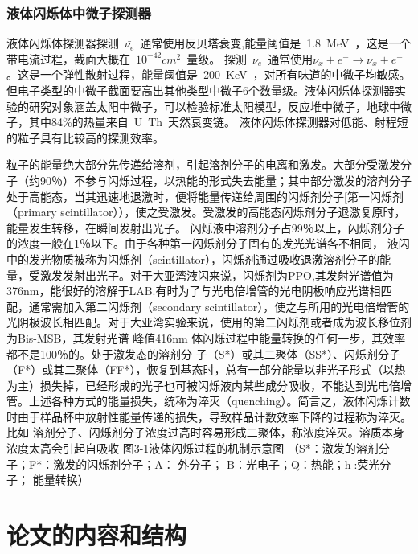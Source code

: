 \subsubsection{液体闪烁体中微子探测器}
液体闪烁体探测器探测~$\bar{\nu_e}$~通常使用反贝塔衰变,能量阈值是~1.8~MeV~，这是一个带电流过程，截面大概在~$10^{-42}cm^2$~量级。
探测~$\nu_e$~通常使用$\nu_x +e ^- \rightarrow \nu_x +e ^-$。这是一个弹性散射过程，能量阈值是~200~KeV~，对所有味道的中微子均敏感。但电子类型的中微子截面要高出其他类型中微子6个数量级。液体闪烁体探测器实验的研究对象涵盖太阳中微子，可以检验标准太阳模型，反应堆中微子，地球中微子，其中84\%的热量来自~U~Th~天然衰变链。
液体闪烁体探测器对低能、射程短的粒子具有比较高的探测效率。

粒子的能量绝大部分先传递给溶剂，引起溶剂分子的电离和激发。大部分受激发分子（约90％）不参与闪烁过程，以热能的形式失去能量；其中部分激发的溶剂分子处于高能态，当其迅速地退激时，便将能量传递给周围的闪烁剂分子[第一闪烁剂 （primary scintillator）），使之受激发。受激发的高能态闪烁剂分子退激复原时，能量发生转移，在瞬间发射出光子。
闪烁液中溶剂分子占99％以上，闪烁剂分子的浓度一般在1％以下。由于各种第一闪烁剂分子固有的发光光谱各不相同，
液闪中的发光物质被称为闪烁剂（scintillator），闪烁剂通过吸收退激溶剂分子的能量，受激发发射出光子。对于大亚湾液闪来说，闪烁剂为PPO,其发射光谱值为376nm，能很好的溶解于LAB.有时为了与光电倍增管的光电阴极响应光谱相匹配，通常需加入第二闪烁剂（secondary scintillator），使之与所用的光电倍增管的光阴极波长相匹配。对于大亚湾实验来说，使用的第二闪烁剂或者成为波长移位剂为Bis-MSB，其发射光谱
峰值416nm
体闪烁过程中能量转换的任何一步，其效率都不是100％的。处于激发态的溶剂分
子（S*）或其二聚体（SS*）、闪烁剂分子（F*）或其二聚体（FF*），恢复到基态时，总有一部分能量以非光子形式（以热为主）损失掉，已经形成的光子也可被闪烁液内某些成分吸收，不能达到光电倍增管。上述各种方式的能量损失，统称为淬灭（quenching）。简言之，液体闪烁计数时由于样品杯中放射性能量传递的损失，导致样品计数效率下降的过程称为淬灭。 比如 溶剂分子、闪烁剂分子浓度过高时容易形成二聚体，称浓度淬灭。溶质本身浓度太高会引起自吸收
图3-1液体闪烁过程的机制示意图
（S*：激发的溶剂分子；F*：激发的闪烁剂分子；A： 外分子；
B：光电子；Q：热能；h:荧光分子；     能量转换）
\section{论文的内容和结构}